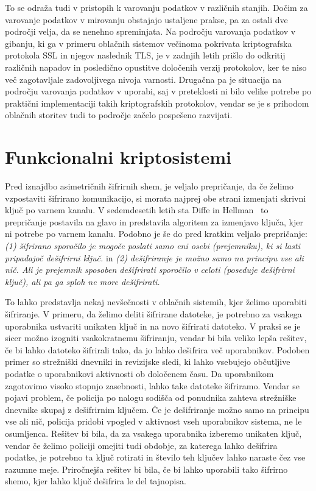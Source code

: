 \documentclass[12pt,a4paper,openany,tikz]{book}
\theoremstyle{plain}
\theoremstyle{definition}
\begin{document}
To se odraža tudi v pristopih k varovanju podatkov v različnih stanjih. Dočim za varovanje podatkov v mirovanju obstajajo ustaljene prakse, pa za ostali dve področji velja, da se nenehno spreminjata. Na področju varovanja podatkov v gibanju, ki ga v primeru oblačnih sistemov večinoma pokrivata kriptografska protokola \acrfull{SSL} in njegov naslednik \acrfull{TLS}, je v zadnjih letih prišlo do odkritij različnih napadov in posledično opustitve določenih verzij protokolov, ker te niso več zagotavljale zadovoljivega nivoja varnosti. Drugačna pa je situacija na področju varovanja podatkov v uporabi, saj v preteklosti ni bilo velike potrebe po praktični implementaciji takih kriptografskih protokolov, vendar se je s prihodom oblačnih storitev tudi to področje začelo pospešeno razvijati.

\section{Funkcionalni kriptosistemi}
\label{sec:Funkcionalni kriptosistemi}

Pred iznajdbo asimetričnih šifrirnih shem, je veljalo prepričanje, da če želimo vzpostaviti šifrirano komunikacijo, si morata najprej obe strani izmenjati skrivni ključ po varnem kanalu. V sedemdesetih letih sta Diffe in Hellman~\cite{diffie1976new} to prepričanje postavila na glavo in predstavila algoritem za izmenjavo ključa, kjer ni potrebe po varnem kanalu.
Podobno je še do pred kratkim veljalo prepričanje: \textit{(1) šifrirano sporočilo je mogoče poslati samo eni osebi (prejemniku), ki si lasti pripadajoč dešifrirni ključ.} in  \textit{(2) dešifriranje je možno samo na principu vse ali nič. Ali je prejemnik sposoben dešifrirati sporočilo v celoti (poseduje dešifrirni ključ), ali pa ga sploh ne more dešifrirati.}

To lahko predstavlja nekaj nevšečnosti v oblačnih sistemih, kjer želimo uporabiti šifriranje. V primeru, da želimo deliti šifrirane datoteke, je potrebno za vsakega uporabnika ustvariti unikaten ključ in na novo šifrirati datoteko. V praksi se je sicer možno izogniti vsakokratnemu šifriranju, vendar bi bila veliko lepša rešitev, če bi lahko datoteko šifrirali tako, da jo lahko dešifrira več uporabnikov. Podoben primer so strežniški dnevniki in revizijske sledi, ki lahko vsebujejo občutljive podatke o uporabnikovi aktivnosti ob določenem času. Da uporabnikom zagotovimo visoko stopnjo zasebnosti, lahko take datoteke šifriramo. Vendar se pojavi problem, če policija po nalogu sodišča od ponudnika zahteva strežniške dnevnike skupaj z dešifrirnim ključem. Če je dešifriranje možno samo na principu vse ali nič, policija pridobi vpogled v aktivnost vseh uporabnikov sistema, ne le osumljenca. Rešitev bi bila, da za vsakega uporabnika izberemo unikaten ključ, vendar če želimo policiji omejiti tudi obdobje, za katerega lahko dešifrira podatke, je potrebno ta ključ rotirati in število teh ključev lahko naraste čez vse razumne meje. Priročnejša rešitev bi bila, če bi lahko uporabili tako šifrirno shemo, kjer lahko ključ dešifrira le del tajnopisa.
\end{document}
